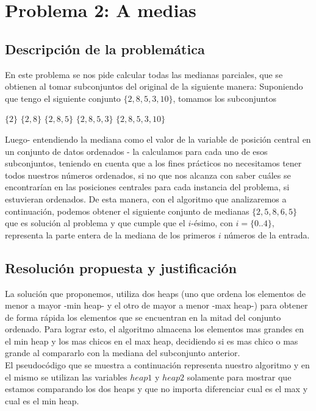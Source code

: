 \section{Problema 2: A medias}

\subsection{Descripción de la problemática}
En este problema se nos pide calcular todas las medianas parciales, que se obtienen al tomar subconjuntos del original de la siguiente manera:
Suponiendo que tengo el siguiente conjunto $\{2,8,5,3,10\}$, tomamos los subconjuntos
\begin{center}
	$\{2\}$ $\{2,8\}$ $\{2,8,5\}$ $\{2,8,5,3\}$ $\{2,8,5,3,10\}$
\end{center}
Luego- entendiendo la mediana como el valor de la variable de posición central en un conjunto de datos ordenados - la calculamos para cada uno de esos subconjuntos, teniendo en cuenta que a los fines prácticos no necesitamos tener todos nuestros números ordenados, si no que nos alcanza con saber cuáles se encontrarían en las posiciones centrales para cada instancia del problema, si estuvieran ordenados. De esta manera, con el algoritmo que analizaremos a continuación, podemos obtener el siguiente conjunto de medianas $\{2,5,8,6,5\}$ que es solución al problema y que cumple que el $i$-ésimo, con $i = \{0 $..$ 4\}$, representa la parte entera de la mediana de los primeros $i$ números de la entrada. 
\subsection{Resolución propuesta y justificación}
La solución que proponemos, utiliza dos heaps (uno que ordena los elementos de menor a mayor -min heap- y el otro de mayor a menor -max heap-) para obtener de forma rápida los elementos que se encuentran en la mitad del conjunto ordenado. Para lograr esto, el algoritmo almacena los elementos mas grandes en el min heap y los mas chicos en el max heap, decidiendo si es mas chico o mas grande al compararlo con la mediana del subconjunto anterior.\\

El pseudocódigo que se muestra a continuación representa nuestro algoritmo y en el mismo se utilizan las variables $heap1$ y $heap2$ solamente para mostrar que estamos comparando los dos heaps y que no importa diferenciar cual es el max y cual es el min heap.\\

